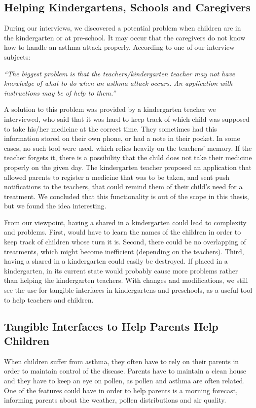\subsection{Helping Kindergartens, Schools and Caregivers}
\label{sec:helpingkindergartenschoolandcaregivers}
During our interviews, we discovered a potential problem when children are in the kindergarten or at pre-school. It may occur that the caregivers do not know how to handle an asthma attack properly. According to one of our interview subjects: 

\textit{``The biggest problem is that the teachers/kindergarten teacher may not have knowledge of what to do when an asthma attack occurs. An application with instructions may be of help to them.''}

A solution to this problem was provided by a kindergarten teacher we interviewed, who said that it was hard to keep track of which child was supposed to take his/her medicine at the correct time. They sometimes had this information stored on their own phone, or had a note in their pocket. In some cases, no such tool were used, which relies heavily on the teachers' memory. If the teacher forgets it, there is a possibility that the child does not take their medicine properly on the given day. 
The kindergarten teacher proposed an application that allowed parents to register a medicine that was to be taken, and sent push notifications to the teachers, that could remind them of their child's need for a treatment. We concluded that this functionality is out of the scope in this thesis, but we found the idea interesting.         

From our viewpoint, having a shared \buddy{} in a kindergarten could lead to complexity and problems. First, \buddy{} would have to learn the names of the children in order to keep track of children whose turn it is. Second, there could be no overlapping of treatments, which might become inefficient (depending on the teachers). Third, having a shared \buddy{} in a kindergarten could easily be destroyed. If placed in a kindergarten, \buddy{} in its current state would probably cause more problems rather than helping the kindergarten teachers. With changes and modifications, we still see the use for tangible interfaces in kindergartens and preschools, as a useful tool to help teachers and children.    


\subsection{Tangible Interfaces to Help Parents Help Children}
\label{sec:tuitohelpparentshelpchildren}
When children suffer from asthma, they often have to rely on their parents in order to maintain control of the disease. Parents have to maintain a clean house and they have to keep an eye on pollen, as pollen and asthma are often related. One of the features \buddy{} could have in order to help parents is a morning forecast, informing parents about the weather, pollen distributions and air quality. 

